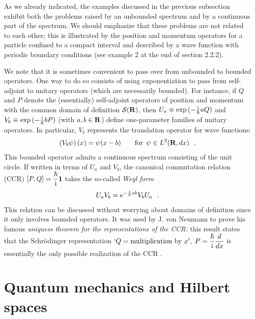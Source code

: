 \documentclass[a4wide,12pt]{report}
\begin{document}
As we already indicated, the examples discussed in the previous subsection 
exhibit both the problems raised by an unbounded 
spectrum and by 
a continuous part of the spectrum. 
We should 
emphasize that these problems are not related to each other;
this is illustrated by the position and momentum operators for 
a particle confined to a compact interval and described by a wave function
 with periodic boundary conditions 
(see example 2 at the end of section 2.2.2).

We note that it is sometimes convenient to pass over from unbounded
to bounded operators. One way to do so consists of using exponentiation
to pass from self-adjoint to unitary operators (which are necessarily 
bounded). 
For instance, if $Q$ and $P$ denote the (essentially) self-adjoint
operators of position and momentum 
with the common domain of definition 
${\cal S}({\bf R})$, then 
$U_a \equiv {\rm exp} \, ( -{{\rm i} \over \hbar} a Q)$ and 
$V_b \equiv {\rm exp} \, ( -{{\rm i} \over \hbar} b P)$ (with $a,b \in {\bf R}$)
 define one-parameter families of unitary operators. 
In particular, $V_b$ represents the translation operator for 
wave functions:
\[
\left( V_b \psi \right) (x) = \psi (x-b) 
\qquad {\rm for} \ \, \psi \in {L^2 ({{\bf R}},dx)}
\ \ .
\]
This bounded operator
admits a continuous spectrum consisting of the unit circle.  
If written in terms of $U_a$ and $V_b$, 
the canonical commutation relation (CCR)
$[P,Q ] = \displaystyle{\hbar \over {\rm i}} {\bf 1}$ takes the so-called
{\em Weyl form} 
\begin{equation}
U_a V_b = {\rm e} ^{-{{\rm i} \over \hbar} ab} V_b U_a
\ \ .
\end{equation}   
This relation can be discussed
without worrying about domains of definition
since it only involves bounded operators.
It was used by J. von Neumann to prove his famous 
{\em uniquess theorem for the representations of the CCR:} 
this result states that the 
Schr\"odinger representation 
$`Q= \mbox{multiplication by} \ x', 
\;  P = \displaystyle{\hbar \over {\rm i}}\displaystyle{d \over dx}$ 
is essentially the only possible realization of the CCR \cite{rs,gap}.  





\chapter{Quantum mechanics and Hilbert spaces}
 
\end{document}

